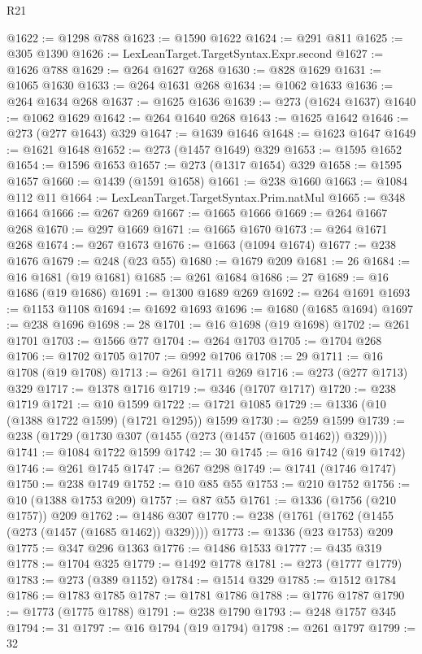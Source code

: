\begin{lexlean}{R21}
\begin{coremodule}
{{{{{{{{{{{{{{{{{{{@1622 := @1298 @788
@1623 := @1590 @1622
@1624 := @291 @811
@1625 := @305 @1390
@1626 := LexLeanTarget.TargetSyntax.Expr.second
@1627 := @1626 @788
@1629 := @264 @1627 @268
@1630 := @828 @1629
@1631 := @1065 @1630
@1633 := @264 @1631 @268
@1634 := @1062 @1633
@1636 := @264 @1634 @268
@1637 := @1625 @1636
@1639 := @273 (@1624 @1637)
@1640 := @1062 @1629
@1642 := @264 @1640 @268
@1643 := @1625 @1642
@1646 := @273 (@277 @1643) @329
@1647 := @1639 @1646
@1648 := @1623 @1647
@1649 := @1621 @1648
@1652 := @273 (@1457 @1649) @329
@1653 := @1595 @1652
@1654 := @1596 @1653
@1657 := @273 (@1317 @1654) @329
@1658 := @1595 @1657
@1660 := @1439 (@1591 @1658)
@1661 := @238 @1660
@1663 := @1084 @112 @11
@1664 := LexLeanTarget.TargetSyntax.Prim.natMul
@1665 := @348 @1664
@1666 := @267 @269
@1667 := @1665 @1666
@1669 := @264 @1667 @268
@1670 := @297 @1669
@1671 := @1665 @1670
@1673 := @264 @1671 @268
@1674 := @267 @1673
@1676 := @1663 (@1094 @1674)
@1677 := @238 @1676
@1679 := @248 (@23 @55)
@1680 := @1679 @209
@1681 := 26
@1684 := @16 @1681 (@19 @1681)
@1685 := @261 @1684
@1686 := 27
@1689 := @16 @1686 (@19 @1686)
@1691 := @1300 @1689 @269
@1692 := @264 @1691
@1693 := @1153 @1108
@1694 := @1692 @1693
@1696 := @1680 (@1685 @1694)
@1697 := @238 @1696
@1698 := 28
@1701 := @16 @1698 (@19 @1698)
@1702 := @261 @1701
@1703 := @1566 @77
@1704 := @264 @1703
@1705 := @1704 @268
@1706 := @1702 @1705
@1707 := @992 @1706
@1708 := 29
@1711 := @16 @1708 (@19 @1708)
@1713 := @261 @1711 @269
@1716 := @273 (@277 @1713) @329
@1717 := @1378 @1716
@1719 := @346 (@1707 @1717)
@1720 := @238 @1719
@1721 := @10 @1599
@1722 := @1721 @1085
@1729 := @1336 (@10 (@1388 @1722 @1599) (@1721 @1295)) @1599
@1730 := @259 @1599
@1739 := @238 (@1729 (@1730 @307 (@1455 (@273 (@1457 (@1605 @1462)) @329))))
@1741 := @1084 @1722 @1599
@1742 := 30
@1745 := @16 @1742 (@19 @1742)
@1746 := @261 @1745
@1747 := @267 @298
@1749 := @1741 (@1746 @1747)
@1750 := @238 @1749
@1752 := @10 @85 @55
@1753 := @210 @1752
@1756 := @10 (@1388 @1753 @209)
@1757 := @87 @55
@1761 := @1336 (@1756 (@210 @1757)) @209
@1762 := @1486 @307
@1770 := @238 (@1761 (@1762 (@1455 (@273 (@1457 (@1685 @1462)) @329))))
@1773 := @1336 (@23 @1753) @209
@1775 := @347 @296 @1363
@1776 := @1486 @1533
@1777 := @435 @319
@1778 := @1704 @325
@1779 := @1492 @1778
@1781 := @273 (@1777 @1779)
@1783 := @273 (@389 @1152)
@1784 := @1514 @329
@1785 := @1512 @1784
@1786 := @1783 @1785
@1787 := @1781 @1786
@1788 := @1776 @1787
@1790 := @1773 (@1775 @1788)
@1791 := @238 @1790
@1793 := @248 @1757 @345
@1794 := 31
@1797 := @16 @1794 (@19 @1794)
@1798 := @261 @1797
@1799 := 32
}}}}}}}}}}}}}}}}}}}
\end{coremodule}
\end{lexlean}
